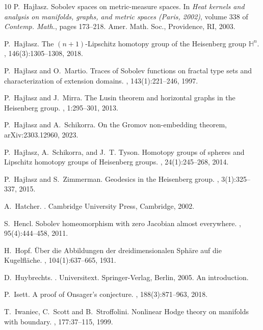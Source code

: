 \documentclass[intlimits,12pt,reqno]{amsart}
\numberwithin{equation}{section}
\theoremstyle{definition}
\begin{document}
\begin{thebibliography}{10}
P.~Haj\l{}asz.
\newblock Sobolev spaces on metric-measure spaces.
\newblock In {\em Heat kernels and analysis on manifolds, graphs, and metric
  spaces ({P}aris, 2002)}, volume 338 of {\em Contemp. Math.}, pages 173--218.
  Amer. Math. Soc., Providence, RI, 2003.

P.~Haj\l{}asz.
\newblock The {$(n+1)$}-{L}ipschitz homotopy group of the {H}eisenberg group
  {$\mathbb{H}^n$}.
, 146(3):1305--1308, 2018.

P.~Haj\l{}asz and O.~Martio.
\newblock Traces of {S}obolev functions on fractal type sets and
  characterization of extension domains.
, 143(1):221--246, 1997.

P.~Haj\l{}asz and J.~Mirra.
\newblock The {L}usin theorem and horizontal graphs in the {H}eisenberg group.
, 1:295--301, 2013.

P.~Hajłasz and A.~Schikorra.
\newblock On the {G}romov non-embedding theorem, 
arXiv:2303.12960, 2023.


P.~Haj\l{}asz, A.~Schikorra, and J.~T. Tyson.
\newblock Homotopy groups of spheres and {L}ipschitz homotopy groups of
  {H}eisenberg groups.
, 24(1):245--268, 2014.

P.~Haj\l{}asz and S.~Zimmerman.
\newblock Geodesics in the {H}eisenberg group.
, 3(1):325--337, 2015.


A.~Hatcher.
.
\newblock Cambridge University Press, Cambridge, 2002.

S.~Hencl.
\newblock Sobolev homeomorphism with zero {J}acobian almost everywhere.
, 95(4):444--458, 2011.

H.~Hopf.
\newblock \"{U}ber die {A}bbildungen der dreidimensionalen {S}ph\"{a}re auf die
  {K}ugelfl\"{a}che.
, 104(1):637--665, 1931.


D.~Huybrechts.
.
\newblock Universitext. Springer-Verlag, Berlin, 2005.
\newblock An introduction.

P.~Isett.
\newblock A proof of {O}nsager's conjecture.
, 188(3):871--963, 2018.

T.~Iwaniec, C.~Scott and B.~Stroffolini.
\newblock Nonlinear {H}odge theory on manifolds with boundary.
, 177:37--115, 1999.


\end{thebibliography}
\end{document}
